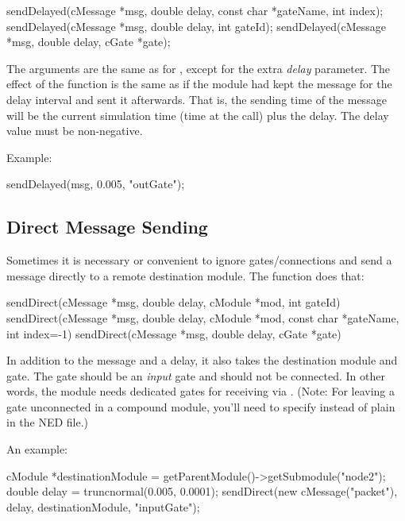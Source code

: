 \begin{cpp}
sendDelayed(cMessage *msg, double delay, const char *gateName, int index);
sendDelayed(cMessage *msg, double delay, int gateId);
sendDelayed(cMessage *msg, double delay, cGate *gate);
\end{cpp}

The arguments are the same as for , except for the extra \textit{delay}
parameter. The effect of the function is the same as if the module
had kept the message for the delay interval and sent it afterwards.
That is, the sending time of the message will be the current
simulation time (time at the  call) plus the delay.
The delay value must be non-negative.

Example:

\begin{cpp}
sendDelayed(msg, 0.005, "outGate");
\end{cpp}



\subsection{Direct Message Sending}
\label{sec:simple-modules:direct-sending}

Sometimes it is necessary or convenient to ignore gates/connections
and send a message directly to a remote destination module. The 
function does that:

\begin{cpp}
sendDirect(cMessage *msg, double delay, cModule *mod, int gateId)
sendDirect(cMessage *msg, double delay, cModule *mod, const char *gateName, int index=-1)
sendDirect(cMessage *msg, double delay, cGate *gate)
\end{cpp}

In addition to the message and a delay, it also takes the destination module
and gate. The gate should be an \textit{input} gate and should not be connected.
In other words, the module needs dedicated gates for receiving via .
(Note: For leaving a gate unconnected in a compound module, you'll need to specify
 instead of plain  in the NED file.)

An example:

\begin{cpp}
cModule *destinationModule = getParentModule()->getSubmodule("node2");
double delay = truncnormal(0.005, 0.0001);
sendDirect(new cMessage("packet"), delay, destinationModule, "inputGate");
\end{cpp}

